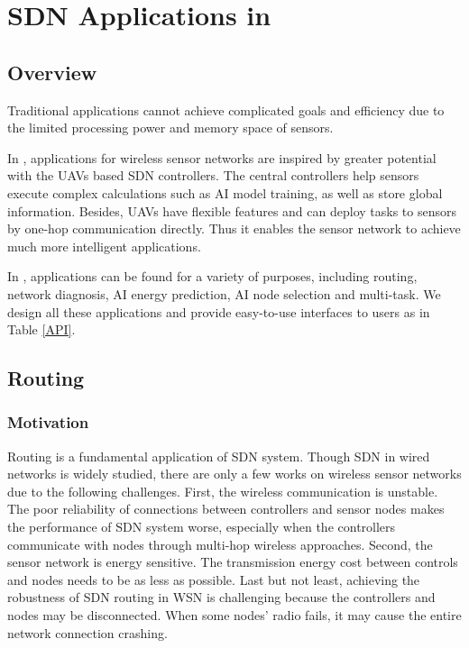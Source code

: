 \section{SDN Applications in {\sdn}}
\label{App}

\subsection{Overview}

Traditional applications cannot achieve complicated goals and efficiency due 
to the limited processing power and memory space of sensors.

In {\sdn}, applications for wireless sensor networks are inspired by 
greater potential with the UAVs based SDN controllers. The central controllers
help sensors execute complex calculations such as AI model training, as well 
as store global information. Besides, UAVs have flexible features and can deploy 
tasks to sensors by one-hop communication directly. Thus it enables the sensor network
to achieve much more intelligent applications.

In {\sdn}, applications can be found for a variety of purposes, including routing, network diagnosis,
AI energy prediction, AI node selection and multi-task. We design all these applications and provide 
easy-to-use interfaces to users as in Table \ref{API}.



\subsection{Routing}
\label{subsectionrouting}

\subsubsection{Motivation}

Routing is a fundamental application of SDN system. 
Though SDN in wired networks is widely studied, there are only
a few works on wireless sensor networks due to the following challenges. 
First, the wireless communication is unstable. The poor reliability of 
connections between controllers and sensor nodes makes the performance of SDN 
system worse, especially when the controllers 
communicate with nodes through multi-hop wireless approaches. 
Second, the sensor network is energy sensitive. 
The transmission energy cost between controls and nodes needs to be as less as possible. 
Last but not least, achieving the robustness of SDN routing in 
WSN is challenging because the controllers and nodes may be 
disconnected. When some nodes' radio fails, it may cause the entire network connection crashing.

